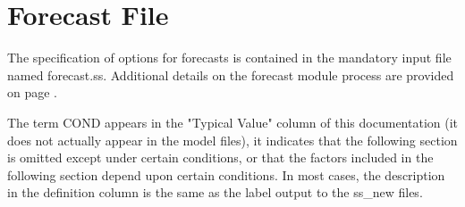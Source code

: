 \section{Forecast File}
The specification of options for forecasts is contained in the mandatory input file named forecast.ss.  Additional details on the forecast module process are provided on page \pageref{sec:forecast}.

The term COND appears in the "Typical Value" column of this documentation (it does not actually appear in the model files), it indicates that the following section is omitted except under certain conditions, or that the factors included in the following section depend upon certain conditions. In most cases, the description in the definition column is the same as the label output to the ss\_new files.


